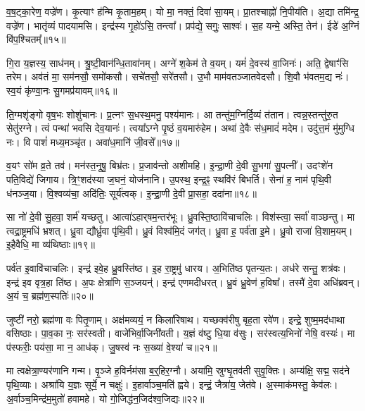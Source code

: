 व॒ष॒ट्का॒रेण॒ वज्रे॑ण।
कृ॒त्याꣳ ह॑न्मि कृ॒ताम॒हम्।
यो मा॒ नक्तं॒ दिवा॑ सा॒यम्।
प्रा॒तश्चाह्नो॑ नि॒पीय॑ति।
अ॒द्या तमि॑न्द्र॒ वज्रे॑ण।
भातृ॑व्यं पादयामसि।
इन्द्र॑स्य गृ॒हो॑ऽसि॒ तन्त्वा᳚।
प्रप॑द्ये॒ सगुः॒ साश्वः॑।
स॒ह यन्मे॒ अस्ति॒ तेन॑।
ईडे॑ अ॒ग्निं वि॑प॒श्चितम्᳚॥१५॥

गि॒रा य॒ज्ञस्य॒ साध॑नम्।
श्रु॒ष्टी॒वान॑न्धि॒तावा॑नम्।
अग्ने॑ श॒केम॑ ते व॒यम्।
यमं॑ दे॒वस्य॑ वा॒जिनः॑।
अति॒ द्वेषाꣳ॑सि तरेम।
अव॑तं मा॒ सम॑नसौ॒ समो॑कसौ।
सचे॑तसौ॒ सरे॑तसौ।
उ॒भौ माम॑वतञ्जातवेदसौ।
शि॒वौ भ॑वतम॒द्य नः॑।
स्व॒यं कृ॑ण्वा॒नः सु॒गमप्र॑यावम्॥१६॥

ति॒ग्मशृ॑ङ्गो वृष॒भः शोशु॑चानः।
प्र॒त्नꣳ स॒धस्थ॒मनु॒ पश्य॑मानः।
आ तन्तु॑म॒ग्निर्दि॒व्यं त॑तान।
त्वन्न॒स्तन्तु॑रु॒त सेतु॑रग्ने।
त्वं पन्था॑ भवसि देव॒यानः॑।
त्वया᳚\-ऽग्ने पृ॒ष्ठं व॒यमारु॑हेम।
अथा॑ दे॒वैः स॑ध॒मादं॑ मदेम।
उदु॑त्त॒मं मु॑मुग्धि नः।
वि पाशं॑ मध्य॒मञ्चृ॑त।
अवा॑ध॒मानि॑ जी॒वसे᳚॥१७॥

व॒यꣳ सो॑म व्र॒ते तव॑।
मन॑स्त॒नूषु॒ बिभ्र॑तः।
प्र॒जाव॑न्तो अशीमहि।
इ॒न्द्रा॒णी दे॒वी सु॒भगा॑ सु॒पत्नी᳚।
उदꣳशे॑न पति॒विद्ये॑ जिगाय।
त्रि॒ꣳ॒शद॑स्या ज॒घनं॒ योज॑नानि।
उ॒पस्थ॒ इन्द्र॒ꣴ॒ स्थवि॑रं बिभर्ति।
सेना॑ ह॒ नाम॑ पृथि॒वी ध॑नञ्ज॒या।
वि॒श्वव्य॑चा॒ अदि॑तिः॒ सूर्य॑त्वक्।
इ॒न्द्रा॒णी दे॒वी प्रा॒सहा॒ ददा॑ना॥१८॥

सा नो॑ दे॒वी सु॒हवा॒ शर्म॑ यच्छतु।
आत्वा॑\-ऽहार्‌\mbox{}षम॒न्तर॑भूः।
ध्रु॒वस्ति॒ष्ठावि॑चाचलिः।
विश॑स्त्वा॒ सर्वा॑ वाञ्छन्तु।
मा त्वद्रा॒ष्ट्रमधि॑ भ्रशत्।
ध्रु॒वा द्यौर्ध्रु॒वा पृ॑थि॒वी।
ध्रु॒वं विश्व॑मि॒दं जग॑त्।
ध्रु॒वा ह॒ पर्व॑ता इ॒मे।
ध्रु॒वो राजा॑ वि॒शाम॒यम्।
इ॒हैवैधि॒ मा व्य॑थिष्ठाः॥१९॥

पर्व॑त इ॒वावि॑चाचलिः।
इन्द्र॑ इवे॒ह ध्रु॒वस्ति॑ष्ठ।
इ॒ह रा॒ष्ट्रमु॑ धारय।
अ॒भिति॑ष्ठ पृतन्य॒तः।
अध॑रे सन्तु॒ शत्र॑वः।
इन्द्र॑ इव वृत्र॒हा ति॑ष्ठ।
अ॒पः क्षेत्रा॑णि स॒ञ्जयन्॑।
इन्द्र॑ एणमदीधरत्।
ध्रु॒वं ध्रु॒वेण॑ ह॒विषा᳚।
तस्मै॑ दे॒वा अधि॑ब्रवन्।
अ॒यं च॒ ब्रह्म॑ण॒स्पतिः॑॥२०॥\anuvakamend[ह॒विर्भि॑रा॒स्य॑मभि॒ दास॑तो विप॒श्चित॒मप्र॑यावञ्जी॒वसे॒ ददा॑ना व्यथिष्ठा ब्रव॒न्नेकं॑ च]

जुष्टी॑ नरो॒ ब्रह्म॑णा वः पितृ॒णाम्।
अक्ष॑मव्ययं॒ न किला॑रिषाथ।
यच्छक्व॑रीषु बृह॒ता रवे॑ण।
इन्द्रे॒ शुष्म॒मद॑धाथा वसिष्ठाः।
पा॒व॒का नः॒ सर॑स्वती।
वाजे॑भिर्वा॒जिनी॑वती।
य॒ज्ञं व॑ष्टु धि॒या व॑सुः।
सर॑स्वत्य॒भिनो॑ नेषि॒ वस्यः॑।
मा प॑स्फरीः॒ पय॑सा॒ मा न॒ आध॑क्।
जु॒षस्व॑ नः स॒ख्या॑ वे॒श्या॑ च॥२१॥

मा त्वक्षेत्रा॒ण्यर॑णानि गन्म।
वृ॒ञ्जे ह॒विर्नम॑सा ब॒र्॒हिर॒ग्नौ।
अया॑मि॒ स्रुग्घृ॒तव॑ती सुवृ॒क्तिः।
अम्य॑क्षि॒ सद्म॒ सद॑ने पृथि॒व्याः।
अश्रा॑यि य॒ज्ञः सूर्ये॒ न चक्षुः॑।
इ॒हार्वाञ्च॒मति॑ ह्वये।
इन्द्रं॒ जैत्रा॑य॒ जेत॑वे।
अ॒स्माक॑मस्तु॒ केव॑लः।
अ॒र्वाञ्च॒मिन्द्र॑म॒मुतो॑ हवामहे।
यो गो॒जिद्ध॑न॒जिद॑श्व॒\-जिद्यः॥२२॥

